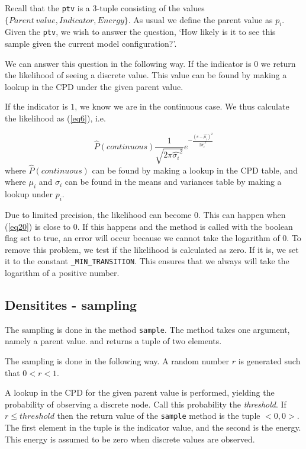 \documentclass[10pt, journal, compsoc, a4paper]{IEEEtran}
\begin{document}
Recall that the \texttt{ptv} is a 3-tuple consisting of the values $\{Parent\ value, Indicator, Energy\}$. As usual we define the parent value as $p_i$. Given the \texttt{ptv}, we wish to answer the question, `How likely is it to see this sample given the current model configuration?'. 

We can answer this question in the following way.  If the indicator is $0$ we return the likelihood of seeing a discrete value. This value can be found by making a lookup in the CPD under the given parent value. 

If the indicator is $1$, we know we are in the continuous case. We thus calculate the likelihood as (\ref{eq6}), i.e.

\begin{equation}
  \hat{P}(continuous) \frac{1}{\sqrt{2\pi\hat{\sigma_i}^2}} e^{ -\frac{(e-\hat{\mu_i})^2}{2\hat{\sigma_i}^2} }
  \label{eq20}
\end{equation}
where $\hat{P}(continuous)$ can be found by making a lookup in the CPD table, and where $\mu_i$ and $\sigma_i$ can be found in the means and variances table by making a lookup under $p_i$.


Due to limited precision, the likelihood can become $0$. This can happen when (\ref{eq20}) is close to $0$. If this happens and the method is called with the boolean flag set to true, an error will occur because we cannot take the logarithm of 0. To remove this problem, we test if the likelihood is calculated as zero. If it is, we set it to the constant \texttt{\_MIN\_TRANSITION}. This ensures that we always will take the logarithm of a positive number.



\subsection{Densitites - sampling} %
\label{sub:densitites_sampling}
The sampling is done in the method \texttt{sample}. The method takes one argument, namely a parent value. and returns a tuple of two elements. 

The sampling is done in the following way. A random number $r$ is generated such that $0 < r < 1$. 

A lookup in the CPD for the given parent value is performed, yielding the probability of observing a discrete node. Call this probability the \emph{threshold}. If $r \leq threshold$ then the return value of the \texttt{sample} method is the tuple $<0,0>$. The first element in the tuple is the indicator value, and the second is the energy. This energy is assumed to be zero when discrete values are observed.
\end{document}
